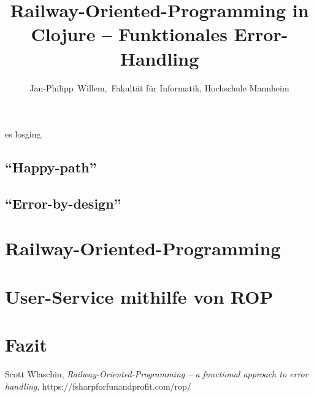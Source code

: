 \documentclass[10pt,journal,compsoc]{IEEEtran}
\begin{document}
  \title{Railway-Oriented-Programming in Clojure -- Funktionales Error-Handling}
  \author{Jan-Philipp~Willem,~Fakultät für Informatik, Hochschule Mannheim}

  \maketitle

   es losging.
  \subsection{"`Happy-path"'}
  \subsection{"`Error-by-design"'}

  \section{Railway-Oriented-Programming}
  \section{User-Service mithilfe von ROP}
  \section{Fazit}
  \begin{thebibliography}{1}

      Scott Wlaschin, \emph{Railway-Oriented-Programming -- a functional approach to error handling}, https://fsharpforfunandprofit.com/rop/
  \end{thebibliography}
\end{document}
